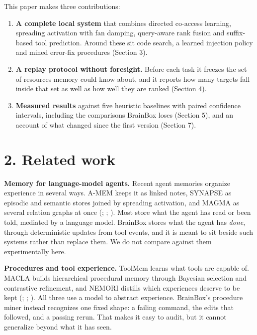 \documentclass[
  american,
  11pt,
]{article}
\providecommand{\tightlist}{%
  \setlength{\itemsep}{0pt}\setlength{\parskip}{0pt}}
\begin{document}
This paper makes three contributions:

\begin{enumerate}
\def\labelenumi{\arabic{enumi}.}
\tightlist
\item
  \textbf{A complete local system} that combines directed co-access learning, spreading activation with fan
  damping, query-aware rank fusion and suffix-based tool prediction. Around these sit code search, a learned
  injection policy and mined error-fix procedures (Section 3).
\item
  \textbf{A replay protocol without foresight.} Before each task it freezes the set of resources memory could
  know about, and it reports how many targets fall inside that set as well as how well they are ranked
  (Section 4).
\item
  \textbf{Measured results} against five heuristic baselines with paired confidence intervals, including the
  comparisons BrainBox loses (Section 5), and an account of what changed since the first version (Section 7).
\end{enumerate}

\section{2. Related work}\label{related-work}

\textbf{Memory for language-model agents.} Recent agent memories organize experience in several ways. A-MEM
keeps it as linked notes, SYNAPSE as episodic and semantic stores joined by spreading activation, and MAGMA as
several relation graphs at once (; ; ). Most store what the agent has read or been
told, mediated by a language model. BrainBox stores what the agent has \emph{done}, through deterministic
updates from tool events, and it is meant to sit beside such systems rather than replace them. We do not
compare against them experimentally here.

\textbf{Procedures and tool experience.} ToolMem learns what tools are capable of. MACLA builds hierarchical
procedural memory through Bayesian selection and contrastive refinement, and NEMORI distills which experiences
deserve to be kept (; ; ). All three use a model to abstract experience. BrainBox's
procedure miner instead recognizes one fixed shape: a failing command, the edits that followed, and a passing
rerun. That makes it easy to audit, but it cannot generalize beyond what it has seen.
\end{document}
